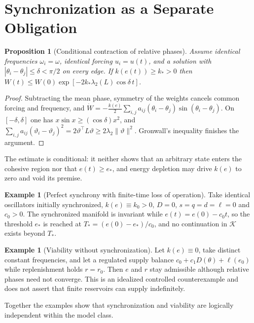 \documentclass[11pt,notitlepage]{report}
\newtheorem{proposition}[theorem]{Proposition}
\theoremstyle{definition}
\newtheorem{example}[theorem]{Example}
\theoremstyle{remark}
\newcommand{\K}{\mathcal K}
\begin{document}
\section{Synchronization as a Separate Obligation}
\begin{proposition}[Conditional contraction of relative phases]\label{prop:contract}
Assume identical frequencies $\omega_i=\omega$, identical forcing $u_i=u(t)$, and a solution with $|\theta_i-\theta_j|\le\delta<\pi/2$ on every edge. If $k(e(t))\ge k_*>0$ then $W(t)\le W(0)\exp[-2k_*\lambda_2(L)\cos\delta\,t]$.
\end{proposition}
\begin{proof}
Subtracting the mean phase, symmetry of the weights cancels common forcing and frequency, and $\dot W=-\tfrac{k(e)}2\sum_{i,j}a_{ij}(\theta_i-\theta_j)\sin(\theta_i-\theta_j)$. On $[-\delta,\delta]$ one has $x\sin x\ge(\cos\delta)x^2$, and $\sum_{i,j}a_{ij}(\vartheta_i-\vartheta_j)^2=2\vartheta^\top L\vartheta\ge2\lambda_2\|\vartheta\|^2$. Gronwall's inequality \cite{gronwall1919} finishes the argument.
\end{proof}
The estimate is conditional: it neither shows that an arbitrary state enters the cohesive region nor that $e(t)\ge e_*$, and energy depletion may drive $k(e)$ to zero and void its premise.

\begin{example}[Perfect synchrony with finite-time loss of operation]\label{ex:exhaust}
Take identical oscillators initially synchronized, $k(e)\equiv k_0>0$, $D=0$, $s=q=d=\ell=0$ and $c_0>0$. The synchronized manifold is invariant while $e(t)=e(0)-c_0t$, so the threshold $e_*$ is reached at $T_*=(e(0)-e_*)/c_0$, and no continuation in $\K$ exists beyond $T_*$.
\end{example}
\begin{example}[Viability without synchronization]
Let $k(e)\equiv0$, take distinct constant frequencies, and let a regulated supply balance $c_0+c_1D(\theta)+\ell(e_0)$ while replenishment holds $r=r_0$. Then $e$ and $r$ stay admissible although relative phases need not converge. This is an idealized controlled counterexample and does not assert that finite reservoirs can supply indefinitely.
\end{example}
Together the examples show that synchronization and viability are logically independent within the model class.
\end{document}

